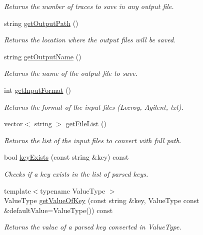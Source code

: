 \begin{DoxyCompactItemize}
\begin{DoxyCompactList}\small\item\em Returns the number of traces to save in any output file. \end{DoxyCompactList}\item 
string \hyperlink{classFileConfigReader_ada0fff82d3ac61d387cd13f40ada5bad}{getOutputPath} ()
\begin{DoxyCompactList}\small\item\em Returns the location where the output files will be saved. \end{DoxyCompactList}\item 
string \hyperlink{classFileConfigReader_a6cd39718f5bcfa0a29fd9a5e7b0f5e20}{getOutputName} ()
\begin{DoxyCompactList}\small\item\em Returns the name of the output file to save. \end{DoxyCompactList}\item 
int \hyperlink{classFileConfigReader_ac33a11b0630e7fd74be69179fc9b5634}{getInputFormat} ()
\begin{DoxyCompactList}\small\item\em Returns the format of the input files (Lecroy, Agilent, txt). \end{DoxyCompactList}\item 
vector$<$ string $>$ \hyperlink{classFileConfigReader_a36cc02e40332f97c5c8f8041247cea31}{getFileList} ()
\begin{DoxyCompactList}\small\item\em Returns the list of the input files to convert with full path. \end{DoxyCompactList}\item 
bool \hyperlink{classFileConfigReader_a66b21500ddf625da9b9aa665141bf75a}{keyExists} (const string \&key) const 
\begin{DoxyCompactList}\small\item\em Checks if a key exists in the list of parsed keys. \end{DoxyCompactList}\item 
{\footnotesize template$<$typename ValueType $>$ }\\ValueType \hyperlink{classFileConfigReader_a0c6b50cde92c7414955d52b6cb4504d8}{getValueOfKey} (const string \&key, ValueType const \&defaultValue=ValueType()) const 
\begin{DoxyCompactList}\small\item\em Returns the value of a parsed key converted in ValueType. \end{DoxyCompactList}\end{DoxyCompactItemize}


